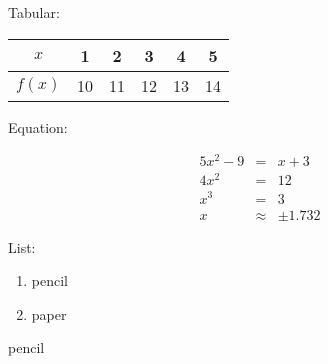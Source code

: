 \documentclass[a4paper,10pt]{article}
\begin{document}
Tabular:\\
\begin{tabular}{|c|ccccc|}

\hline
 $x$ & 1 & 2 & 3 & 4 & 5  \\\hline
 $f(x)$ & 10 & 11 & 12 & 13 & 14\\ \hline
 
 \end{tabular}

 \newpage
 Equation:
 
 \begin{eqnarray}%
  5x^2-9&=&x+3\\%
  4x^2&=&12\\
  x^3&=&3\\
  x&\approx&\pm1.732
 \end{eqnarray}

 List:
 \begin{enumerate}
  \item pencil
  \item paper
 \end{enumerate}
  pencil
\end{document}

